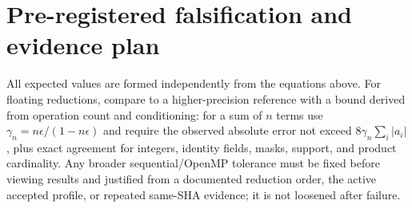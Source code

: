 \documentclass[11pt]{article}
\begin{document}
\section{Pre-registered falsification and evidence plan}

All expected values are formed independently from the equations above. For
floating reductions, compare to a higher-precision reference with a bound
derived from operation count and conditioning: for a sum of \(n\) terms use
\(\gamma_n=n\epsilon/(1-n\epsilon)\) and require the observed absolute error
not exceed \(8\gamma_n\sum_i|a_i|\), plus exact agreement for integers,
identity fields, masks, support, and product cardinality. Any broader
sequential/OpenMP tolerance must be fixed before viewing results and justified
from a documented reduction order, the active accepted profile, or repeated
same-SHA evidence; it is not loosened after failure.
\end{document}
